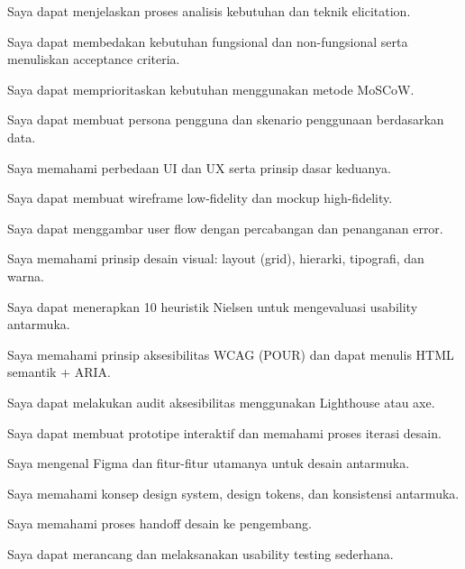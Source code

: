 \documentclass[../main.tex]{subfiles}
\begin{document}
\begin{checklist}
  \item Saya dapat menjelaskan proses analisis kebutuhan dan teknik elicitation.
  \item Saya dapat membedakan kebutuhan fungsional dan non-fungsional serta menuliskan acceptance criteria.
  \item Saya dapat memprioritaskan kebutuhan menggunakan metode MoSCoW.
  \item Saya dapat membuat persona pengguna dan skenario penggunaan berdasarkan data.
  \item Saya memahami perbedaan UI dan UX serta prinsip dasar keduanya.
  \item Saya dapat membuat wireframe low-fidelity dan mockup high-fidelity.
  \item Saya dapat menggambar user flow dengan percabangan dan penanganan error.
  \item Saya memahami prinsip desain visual: layout (grid), hierarki, tipografi, dan warna.
  \item Saya dapat menerapkan 10 heuristik Nielsen untuk mengevaluasi usability antarmuka.
  \item Saya memahami prinsip aksesibilitas WCAG (POUR) dan dapat menulis HTML semantik + ARIA.
  \item Saya dapat melakukan audit aksesibilitas menggunakan Lighthouse atau axe.
  \item Saya dapat membuat prototipe interaktif dan memahami proses iterasi desain.
  \item Saya mengenal Figma dan fitur-fitur utamanya untuk desain antarmuka.
  \item Saya memahami konsep design system, design tokens, dan konsistensi antarmuka.
  \item Saya memahami proses handoff desain ke pengembang.
  \item Saya dapat merancang dan melaksanakan usability testing sederhana.
\end{checklist}
\end{document}
